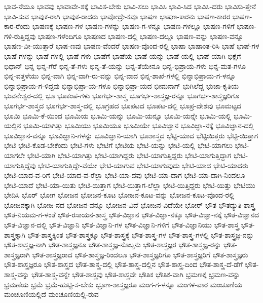 {ಭಾವ-ನೆಯೂ
ಭಾವವು
ಭಾವಾವೇ-ಶಕ್ಕೆ
ಭಾವಿಸ-ಬೇಕು
ಭಾವಿ-ಸಲು
ಭಾವಿಸಿ
ಭಾವಿ-ಸಿದ
ಭಾವಿಸಿ-ದರು
ಭಾವಿಸು-ತ್ತೇನೆ
ಭಾವಿ-ಸುವ
ಭಾವುಕ-ರಾಗಿ
ಭಾವುಕ-ರಾದರು
ಭಾವೋದ್ರೇ-ಕವೂ
ಭಾಷಣ
ಭಾಷಣ-ಕಾರನು
ಭಾಷಣ-ಕಾರರ
ಭಾಷಣ-ಕಾರ-ರೆಂದು
ಭಾಷಣಕ್ಕೆ
ಭಾಷಣ-ಗಳ
ಭಾಷಣ-ಗಳನ್ನು
ಭಾಷಣ-ಗ-ಳನ್ನೂ
ಭಾಷಣ-ಗಳಲ್ಲೂ
ಭಾಷಣ-ಗಳಿಗೆ
ಭಾಷಣ-ಗಳಿ-ರುತ್ತಿದ್ದವು
ಭಾಷಣ-ಗಳೆಂದಿಗೂ
ಭಾಷಣದ
ಭಾಷಣ-ದಲ್ಲಿ
ಭಾಷಣ-ದಲ್ಲೂ
ಭಾಷಣ-ವನ್ನು
ಭಾಷಣ-ವನ್ನೂ
ಭಾಷಣ-ವೀ-ಯುತ್ತಾರೆ
ಭಾಷ-ಣವು
ಭಾಷಣ-ವೆಂದರೆ
ಭಾಷಣ-ವೊಂದ-ರಲ್ಲಿ
ಭಾಷಾ
ಭಾಷಾಂತ-ರಿಸಿ
ಭಾಷೆ
ಭಾಷೆ-ಗಳ
ಭಾಷೆ-ಗಳನ್ನು
ಭಾಷೆ-ಗಳಲ್ಲಿ
ಭಾಷೆ-ಗಳು
ಭಾಷೆಗೆ
ಭಾಷೆಯ
ಭಾಷೆ-ಯನ್ನು
ಭಾಷೆ-ಯಲ್ಲಿ
ಭಾಷೆ-ಯಾಗಿ
ಭಿಕ್ಷೆಗೆ
ಭಿಧಾನ್
ಭಿನ್ನ
ಭಿನ್ನ-ಗೆರೆ
ಭಿನ್ನ-ತೆ-ಗಳು
ಭಿನ್ನ-ತೆ-ಯನ್ನು
ಭಿನ್ನ-ತೆಯೇನೂ
ಭಿನ್ನ-ಭಿಪ್ರಾಯ-ಗಳು
ಭಿನ್ನ-ಮತ-ಗಳೂ
ಭಿನ್ನ-ವತ್ತಳೆಯು
ಭಿನ್ನ-ವಾಗಿ
ಭಿನ್ನ-ವಾಗಿ-ರು-ವನ್ನು
ಭಿನ್ನ-ವಾದ
ಭಿನ್ನ-ಶಾಖೆ-ಗಳಲ್ಲಿ
ಭಿನ್ನಾಭಿಪ್ರಾಯ-ಗ-ಳನ್ನೂ
ಭಿನ್ನಾಭಿಪ್ರಾಯ-ಗ-ಳಿದ್ದವು
ಭಿನ್ನಾಭಿಪ್ರಾ-ಯ-ಗಳೂ
ಭಿನ್ನಾಭಿಪ್ರಾ-ಯದ
ಭೀಮನಾಗ್
ಭುಗಿಲೆದ್ದ
ಭುಜಾ-ಕೃತಿಯ
ಭುವನೇಶ್ವರ-ದಲ್ಲಿ
ಭೂ
ಭೂಕಂಪ-ಗಳು
ಭೂಗರ್ಭ-ಶಾಸ್ತ್ರ
ಭೂಗರ್ಭ-ಶಾಸ್ತ್ರಜ್ಞ-ರನ್ನೂ
ಭೂಗರ್ಭ-ಶಾಸ್ತ್ರಜ್ಞರಿಗೂ
ಭೂಗರ್ಭ-ಶಾಸ್ತ್ರದ
ಭೂಗರ್ಭ-ಶಾಸ್ತ್ರ-ದಲ್ಲಿ
ಭೂಗ್ರಹದ
ಭೂಪಟದ
ಭೂಪಟ-ದಲ್ಲಿ
ಭೂಪ್ರ-ದೇಶವು
ಭೂಮಟ್ಟದ
ಭೂಮಿ
ಭೂಮಿ-ಕೆ-ಯಿಂದ
ಭೂಮಿಯ
ಭೂಮಿ-ಯನ್ನು
ಭೂಮಿ-ಯನ್ನೂ
ಭೂಮಿ-ಯನ್ನೇ
ಭೂಮಿ-ಯಲ್ಲಿ
ಭೂಮಿ-ಯಲ್ಲಿನ
ಭೂಮಿ-ಯಾಗಿತ್ತು
ಭೂಮಿಯು
ಭೂಮಿಯೂ
ಭೂಮಿಯೇ
ಭೂವಿಜ್ಞಾನ
ಭೂವಿಜ್ಞಾ-ನಕ್ಕೆ
ಭೂವಿಜ್ಞಾನ-ದಲ್ಲಿ
ಭೂವಿಜ್ಞಾನ-ವನ್ನೂ
ಭೂವಿಜ್ಞಾನಿ-ಗಳನ್ನು
ಭೂವಿಜ್ಞಾನಿ-ಯಾಗಿ
ಭೂಶಾಸ್ತ್ರದ
ಭೆಟ್ಟಿ-ಯಾದ
ಭೆಟ್ಟಿಯಿತ್ತರು
ಭೆಟ್ಟಿ-ಯಿತ್ತಾಗ
ಭೇಟಿ
ಭೇಟಿ-ಕೊಡ-ಬೇಕೆಂದು
ಭೇಟಿ-ಗಳು
ಭೇಟಿಗೆ
ಭೇಟಿಯ
ಭೇಟಿ-ಯನ್ನು
ಭೇಟಿ-ಯಲ್ಲಿ
ಭೇಟಿ-ಯಾಗಲು
ಭೇಟಿ-ಯಾಗಲೇ
ಭೇಟಿ-ಯಾಗಿ
ಭೇಟಿ-ಯಾಗಿತ್ತು
ಭೇಟಿ-ಯಾಗಿದ್ದರು
ಭೇಟಿ-ಯಾಗುತ್ತಿದ್ದರು
ಭೇಟಿ-ಯಾಗುತ್ತಿದ್ದಾಗ
ಭೇಟಿ-ಯಾಗುತ್ತಿದ್ದೆವು
ಭೇಟಿ-ಯಾಗುತ್ತಿದ್ದೇ-ವೆಯೇ
ಭೇಟಿ-ಯಾಗುವ
ಭೇಟಿ-ಯಾಗುವುದು
ಭೇಟಿ-ಯಾದ
ಭೇಟಿ-ಯಾದರು
ಭೇಟಿ-ಯಾದ-ವ-ರಿಗೆ
ಭೇಟಿ-ಯಾದ-ವ-ರೆಲ್ಲಾ
ಭೇಟಿ-ಯಾ-ದವು
ಭೇಟಿ-ಯಾ-ದಾಗ
ಭೇಟಿ-ಯಾ-ದಾಗಿ-ನಿಂದಲೂ
ಭೇಟಿ-ಯಾದೆ
ಭೇಟಿ-ಯಾ-ಯಿತು
ಭೇಟಿ-ಯಿತ್ತಾಗ
ಭೇಟಿ-ಯಿತ್ತಾಗ-ಲೆಲ್ಲಾ
ಭೇಟಿ-ಯಿತ್ತಿದ್ದರು
ಭೇಟಿ-ಯಿತ್ತು
ಭೇಟಿಯು
ಭೇದಿಸಿ
ಭೊರ್
ಭೋಗ
ಭೋಜನ
ಭೋಜನ-ಕೂಟ
ಭೋಜನ-ಕೂಟ-ವನ್ನು
ಭೋಜನ-ಕೂಟ-ವೊಂದ-ರಲ್ಲಿ
ಭೋಜನಕ್ಕಾಗಿ
ಭೋಜ-ನದ
ಭೋಜನ-ವನ್ನೂ
ಭೋಜನ-ವಿದೆ
ಭೋಜನ-ವಿದೆಯೇ
ಭೋರ್
ಭೌತ
ಭೌತದ್ಯುತಿ-ಶಾಸ್ತ್ರ
ಭೌತ-ನಿಯಮ-ಗ-ಳಂತೆ
ಭೌತ-ರಸಾಯನ-ಶಾಸ್ತ್ರ
ಭೌತ-ವಿಜ್ಞಾನ
ಭೌತ-ವಿಜ್ಞಾ-ನಕ್ಕೂ
ಭೌತ-ವಿಜ್ಞಾ-ನಕ್ಕೆ
ಭೌತ-ವಿಜ್ಞಾನದ
ಭೌತ-ವಿಜ್ಞಾನ-ದಲ್ಲಿ
ಭೌತ-ವಿಜ್ಞಾನಿ
ಭೌತ-ವಿಜ್ಞಾನಿ-ಗಳ
ಭೌತ-ವಿಜ್ಞಾನಿ-ಗಳಿಗೆ
ಭೌತ-ವಿಜ್ಞಾನಿಯು
ಭೌತ-ಶಾಸ್ತ್ರ
ಭೌತ-ಶಾಸ್ತ್ರಕ್ಕಾಗಿ
ಭೌತ-ಶಾಸ್ತ್ರಕ್ಕಿಂತ
ಭೌತ-ಶಾಸ್ತ್ರಕ್ಕೂ
ಭೌತ-ಶಾಸ್ತ್ರಕ್ಕೆ
ಭೌತ-ಶಾಸ್ತ್ರ-ಗಳ
ಭೌತ-ಶಾಸ್ತ್ರ-ಗಳಲ್ಲಿ
ಭೌತ-ಶಾಸ್ತ್ರಜ್ಞ-ನನ್ನು
ಭೌತ-ಶಾಸ್ತ್ರಜ್ಞ-ನಾಗಿ
ಭೌತ-ಶಾಸ್ತ್ರಜ್ಞನೂ
ಭೌತ-ಶಾಸ್ತ್ರಜ್ಞ-ನೊಬ್ಬನು
ಭೌತ-ಶಾಸ್ತ್ರಜ್ಞರ
ಭೌತ-ಶಾಸ್ತ್ರಜ್ಞ-ರನ್ನು
ಭೌತ-ಶಾಸ್ತ್ರಜ್ಞರಾಗಿ
ಭೌತ-ಶಾಸ್ತ್ರಜ್ಞರಾದ
ಭೌತ-ಶಾಸ್ತ್ರಜ್ಞ-ರಿಂದಲೂ
ಭೌತ-ಶಾಸ್ತ್ರಜ್ಞರಿಗೂ
ಭೌತ-ಶಾಸ್ತ್ರಜ್ಞರಿಗೆ
ಭೌತ-ಶಾಸ್ತ್ರಜ್ಞರು
ಭೌತ-ಶಾಸ್ತ್ರಜ್ಞರೂ
ಭೌತ-ಶಾಸ್ತ್ರದ
ಭೌತ-ಶಾಸ್ತ್ರ-ದಲ್ಲಿ
ಭೌತ-ಶಾಸ್ತ್ರ-ದಲ್ಲಿನ
ಭೌತ-ಶಾಸ್ತ್ರ-ದಿಂದ
ಭೌತ-ಶಾಸ್ತ್ರ-ದೆ-ಡೆಗೆ
ಭೌತ-ಶಾಸ್ತ್ರ-ವನ್ನು
ಭೌತ-ಶಾಸ್ತ್ರ-ವನ್ನೇ
ಭೌತ-ಶಾಸ್ತ್ರವು
ಭೌತ-ಶಾಸ್ತ್ರವೇ
ಭೌತಿಕ
ಭೌತಿಕ-ವಾಗಿ
ಭ್ರಮಣಕ್ಕೆ
ಭ್ರಮಣ-ವನ್ನು
ಭ್ರಮಣೆಯ
ಭ್ರಮೆ
ಭ್ರಮೆ-ಹುಟ್ಟಿ-ಸ-ಬೇಕು
ಭ್ರೂಣ-ಶಾಸ್ತ್ರಜ್ಞರೂ
ಮಂಗ-ಗ-ಳನ್ನೂ
ಮಂಗಳ-ವಾರ
ಮಂಚೂಣಿಯ
ಮಂಚೂಣಿಯಲ್ಲಿದೆ
ಮಂಚೂಣಿಯಲ್ಲಿ-ರುವ
}
